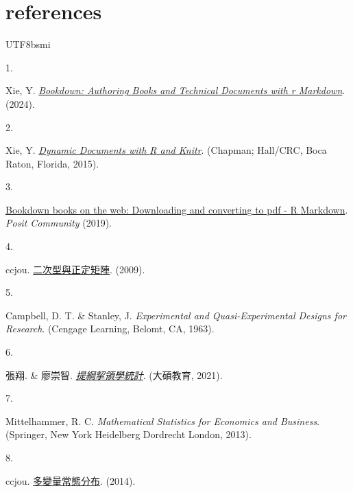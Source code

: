 \documentclass[
]{book}
\newlength{\cslhangindent}
\newlength{\csllabelwidth}
\newlength{\cslentryspacingunit} %
\newenvironment{CSLReferences}[2] %
 {%
  \setlength{\parindent}{0pt}
  \ifodd #1
  \let\oldpar\par
  \def\par{\hangindent=\cslhangindent\oldpar}
  \fi
  \setlength{\parskip}{#2\cslentryspacingunit}
 }%
 {}
\newcommand{\CSLLeftMargin}[1]{\parbox[t]{\csllabelwidth}{#1}}
\newcommand{\CSLRightInline}[1]{\parbox[t]{\linewidth - \csllabelwidth}{#1}\break}
\theoremstyle{definition}
\theoremstyle{definition}
\theoremstyle{definition}
\theoremstyle{definition}
\theoremstyle{remark}
\begin{document}
\hypertarget{references}{%
\chapter*{references}\label{references}}
\begin{CJK}{UTF8}{bsmi}
\hypertarget{refs}{}
\begin{CSLReferences}{0}{0}
\leavevmode{}%
\CSLLeftMargin{1. }%
\CSLRightInline{Xie, Y. \emph{\href{https://github.com/rstudio/bookdown}{Bookdown: Authoring Books and Technical Documents with r Markdown}}. (2024).}

\leavevmode{}%
\CSLLeftMargin{2. }%
\CSLRightInline{Xie, Y. \emph{\href{http://yihui.org/knitr/}{Dynamic Documents with {R} and Knitr}}. (Chapman; Hall/CRC, Boca Raton, Florida, 2015).}

\leavevmode{}%
\CSLLeftMargin{3. }%
\CSLRightInline{\href{https://community.rstudio.com/t/bookdown-books-on-the-web-downloading-and-converting-to-pdf/30268}{Bookdown books on the web: Downloading and converting to pdf - {R} {Markdown}}. \emph{Posit Community} (2019).}

\leavevmode{}%
\CSLLeftMargin{4. }%
\CSLRightInline{ccjou. \href{https://ccjou.wordpress.com/2009/10/21/\%e4\%ba\%8c\%e6\%ac\%a1\%e5\%9e\%8b\%e8\%88\%87\%e6\%ad\%a3\%e5\%ae\%9a\%e7\%9f\%a9\%e9\%99\%a3/}{二次型與正定矩陣}. (2009).}

\leavevmode{}%
\CSLLeftMargin{5. }%
\CSLRightInline{Campbell, D. T. \& Stanley, J. \emph{Experimental and Quasi-Experimental Designs for Research}. (Cengage Learning, Belomt, CA, 1963).}

\leavevmode{}%
\CSLLeftMargin{6. }%
\CSLRightInline{張翔. \& 廖崇智. \emph{\href{https://www.books.com.tw/products/0010888833}{提綱挈領學統計}}. (大碩教育, 2021).}

\leavevmode{}%
\CSLLeftMargin{7. }%
\CSLRightInline{Mittelhammer, R. C. \emph{Mathematical Statistics for Economics and Business}. (Springer, New York Heidelberg Dordrecht London, 2013).}

\leavevmode{}%
\CSLLeftMargin{8. }%
\CSLRightInline{ccjou. \href{https://ccjou.wordpress.com/2014/06/05/\%e5\%a4\%9a\%e8\%ae\%8a\%e9\%87\%8f\%e5\%b8\%b8\%e6\%85\%8b\%e5\%88\%86\%e5\%b8\%83/}{多變量常態分布}. (2014).}


\end{CSLReferences}
\end{CJK}
\end{document}
